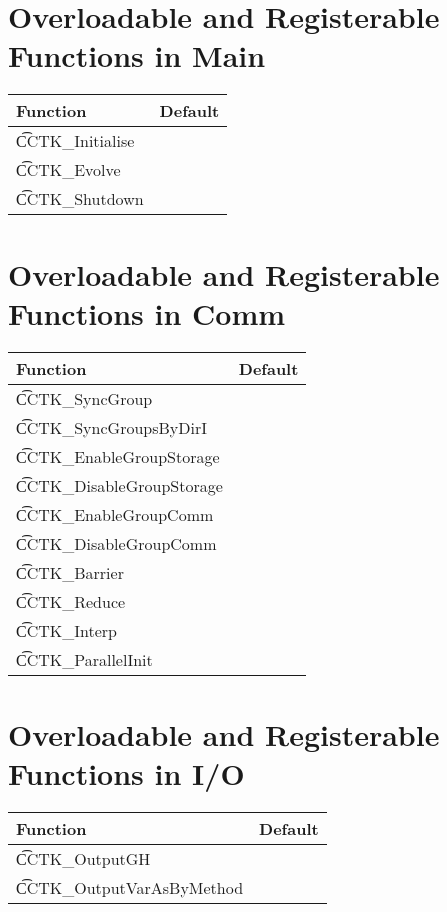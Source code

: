 \section{Overloadable and Registerable Functions in Main}

 \begin{tabular}{|l|l|}
   \hline  {\bf Function} & {\bf Default} \\
   \hline {\t CCTK\_Initialise}           &\\
   \hline {\t CCTK\_Evolve}               &\\
   \hline {\t CCTK\_Shutdown}             &\\
   \hline
 \end{tabular}

\section{Overloadable and Registerable Functions in Comm}

  \begin{tabular}{|l|l|}
   \hline {\bf Function} & {\bf Default}  \\
   \hline {\t CCTK\_SyncGroup}           &\\
   \hline {\t CCTK\_SyncGroupsByDirI}    &\\
   \hline {\t CCTK\_EnableGroupStorage}  &\\
   \hline {\t CCTK\_DisableGroupStorage} &\\
   \hline {\t CCTK\_EnableGroupComm}     &\\
   \hline {\t CCTK\_DisableGroupComm}    &\\
   \hline {\t CCTK\_Barrier}             &\\
   \hline {\t CCTK\_Reduce}              &\\
   \hline {\t CCTK\_Interp}              &\\
   \hline {\t CCTK\_ParallelInit}        &\\
   \hline
  \end{tabular}

\section{Overloadable and Registerable Functions in I/O}

 \begin{tabular}{|l|l|}
   \hline {\bf Function} & {\bf Default}   \\
   \hline {\t CCTK\_OutputGH}            & \\
   \hline {\t CCTK\_OutputVarAsByMethod} & \\
   \hline
 \end{tabular}

